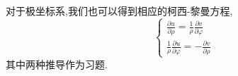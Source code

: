 对于极坐标系,我们也可以得到相应的柯西-黎曼方程,
\begin{equation}
    \left\{\begin{array}{l}
    \frac{\partial u}{\partial \rho}=\frac{1}{\rho} \frac{\partial v}{\partial \varphi} \\
    \frac{1}{\rho} \frac{\partial u}{\partial \varphi}=-\frac{\partial v}{\partial \rho}
    \end{array}\right.
    \end{equation}
其中两种推导作为习题.